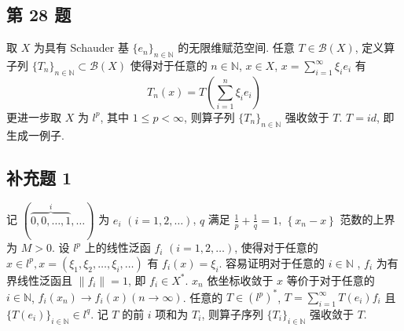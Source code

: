\documentclass[../main.tex]{subfiles}
\begin{document}
\subsection{第 28 题}
取 $X$ 为具有 Schauder 基 $\{ e_{n} \}_{n \in \mathbb{N}}$ 的无限维赋范空间.
任意 $T \in \mathscr{B} \left( X \right)$, 定义算子列 $\{ T_{n} \}_{n \in \mathbb{N}} \subset \mathscr{B} \left( X \right)$
使得对于任意的 $n \in \mathbb{N}$, $x \in X$, $x = \sum_{i = 1}^{\infty} \xi_i e_i$ 有
\[
    T_n \left( x \right) = T \left( \sum_{i = 1}^{n} \xi_i e_i \right)
\]
更进一步取 $X$ 为 $l^p$, 其中 $1 \leqslant p < \infty$,
则算子列 $\{ T_{n} \}_{n \in \mathbb{N}}$ 强收敛于 $T$.
$T = id$, 即生成一例子.

\subsection{补充题 1}
记 $( \overbrace{0, 0, \dots , 1}^i, \dots )$ 为 $e_i$ $\left( i = 1, 2, \dots \right)$,
$q$ 满足 $\frac{1}{p} + \frac{1}{q} = 1$,
$\left\{ x_n - x \right\}$ 范数的上界为 $M > 0$.
设 $l^p$ 上的线性泛函 $f_i$ $(i = 1, 2, \dots)$,
使得对于任意的 $x \in l^p, x = \left( \xi_1, \xi_2, \dots , \xi_i, \dots \right)$ 有 $f_i \left( x \right) = \xi_i$.
容易证明对于任意的 $i \in \mathbb{N}$ , $f_i$ 为有界线性泛函且 $\| f_i \| = 1$, 即 $f_i \in X^*$.
$x_n$ 依坐标收敛于 $x$ 等价于对于任意的 $i \in \mathbb{N}$, $f_i \left( x_n \right) \to f_i \left( x \right) \left( n \to \infty \right)$.
任意的 $T \in \left( l^p \right)^*$, $T = \sum_{i = 1}^{\infty} T \left( e_i \right) f_i$ 且 $\{ T \left( e_{i} \right) \}_{i \in \mathbb{N}} \in l^q$.
记 $T$ 的前 $i$ 项和为 $T_i$, 则算子序列 $\{ T_{i} \}_{i \in \mathbb{N}}$ 强收敛于 $T$.
\end{document}
